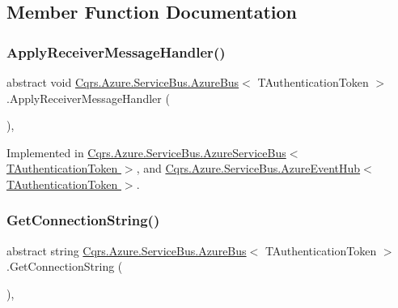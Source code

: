 \subsection{Member Function Documentation}
\mbox{\label{classCqrs_1_1Azure_1_1ServiceBus_1_1AzureBus_aad25a164e9e526c59d8ef98635c98095}} 
\subsubsection{\texorpdfstring{Apply\+Receiver\+Message\+Handler()}{ApplyReceiverMessageHandler()}}
{\footnotesize\ttfamily abstract void \hyperlink{classCqrs_1_1Azure_1_1ServiceBus_1_1AzureBus}{Cqrs.\+Azure.\+Service\+Bus.\+Azure\+Bus}$<$ T\+Authentication\+Token $>$.Apply\+Receiver\+Message\+Handler (\begin{DoxyParamCaption}{ }\end{DoxyParamCaption})\hspace{0.3cm}{\ttfamily [protected]}, {}}



Implemented in \hyperlink{classCqrs_1_1Azure_1_1ServiceBus_1_1AzureServiceBus_a6ea94560e02fce0d920c467062f5fc98}{Cqrs.\+Azure.\+Service\+Bus.\+Azure\+Service\+Bus$<$ T\+Authentication\+Token $>$}, and \hyperlink{classCqrs_1_1Azure_1_1ServiceBus_1_1AzureEventHub_af2efc497815828b6fe0b4d6621bc8b41}{Cqrs.\+Azure.\+Service\+Bus.\+Azure\+Event\+Hub$<$ T\+Authentication\+Token $>$}.

\mbox{\label{classCqrs_1_1Azure_1_1ServiceBus_1_1AzureBus_a514e371d5ce093678365af31e6c274e3}} 
\subsubsection{\texorpdfstring{Get\+Connection\+String()}{GetConnectionString()}}
{\footnotesize\ttfamily abstract string \hyperlink{classCqrs_1_1Azure_1_1ServiceBus_1_1AzureBus}{Cqrs.\+Azure.\+Service\+Bus.\+Azure\+Bus}$<$ T\+Authentication\+Token $>$.Get\+Connection\+String (\begin{DoxyParamCaption}{ }\end{DoxyParamCaption})\hspace{0.3cm}{\ttfamily [protected]}, {}}



